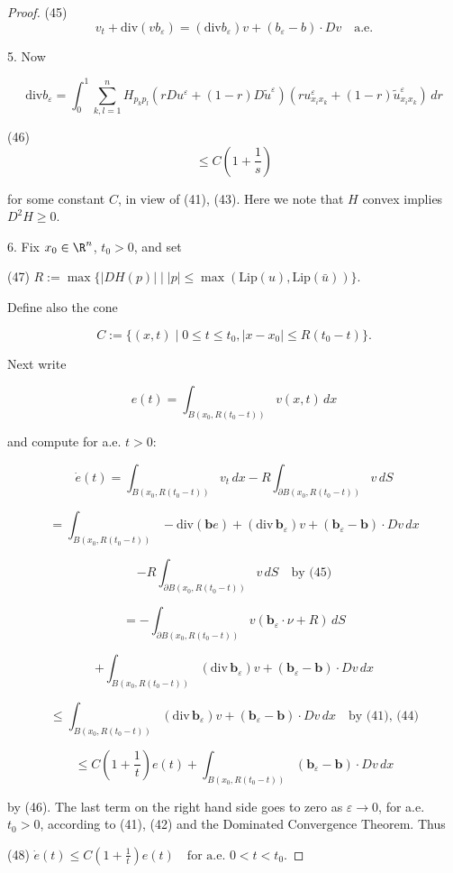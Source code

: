\begin{proof}
(45)
$$v_t + \text{div}(vb_\varepsilon) = (\text{div} b_\varepsilon)v + (b_\varepsilon - b) \cdot Dv \quad \text{a.e.}$$

5. Now

$$\text{div} b_\varepsilon = \int_0^1 \sum_{k,l=1}^n H_{p_k p_l}(rDu^\varepsilon + (1-r)D\tilde{u}^\varepsilon)(ru^\varepsilon_{x_i x_k} + (1-r)\tilde{u}^\varepsilon_{x_i x_k}) \, dr$$

(46)
$$\leq C \left(1 + \frac{1}{s}\right)$$

for some constant $C$, in view of (41), (43). Here we note that $H$ convex implies $D^2H \geq 0$.

6. Fix $x_0 \in \R^n$, $t_0 > 0$, and set

(47) \quad $R := \max\{|DH(p)| \mid |p| \leq \max(\text{Lip}(u), \text{Lip}(\bar{u}))\}$.

Define also the cone

$$C := \{(x,t) \mid 0 \leq t \leq t_0, |x - x_0| \leq R(t_0 - t)\}.$$

Next write

$$e(t) = \int_{B(x_0, R(t_0-t))} v(x,t)\,dx$$

and compute for a.e. $t > 0$:

$$\dot{e}(t) = \int_{B(x_0,R(t_0-t))} v_t\,dx - R \int_{\partial B(x_0, R(t_0-t))} v\,dS$$

$$= \int_{B(x_0,R(t_0-t))} -\text{div}(\mathbf{b}e) + (\text{div}\,\mathbf{b}_\varepsilon)v + (\mathbf{b}_\varepsilon - \mathbf{b}) \cdot Dv\,dx$$

$$- R \int_{\partial B(x_0, R(t_0-t))} v\,dS \quad \text{by (45)}$$

$$= - \int_{\partial B(x_0, R(t_0-t))} v(\mathbf{b}_\varepsilon \cdot \nu + R)\,dS$$

$$+ \int_{B(x_0, R(t_0-t))} (\text{div}\,\mathbf{b}_\varepsilon)v + (\mathbf{b}_\varepsilon - \mathbf{b}) \cdot Dv\,dx$$

$$\leq \int_{B(x_0, R(t_0-t))} (\text{div}\,\mathbf{b}_\varepsilon)v + (\mathbf{b}_\varepsilon - \mathbf{b}) \cdot Dv\,dx \quad \text{by (41), (44)}$$

$$\leq C\left(1 + \frac{1}{t}\right)e(t) + \int_{B(x_0, R(t_0-t))} (\mathbf{b}_\varepsilon - \mathbf{b}) \cdot Dv\,dx$$

by (46). The last term on the right hand side goes to zero as $\varepsilon \to 0$, for a.e. $t_0 > 0$, according to (41), (42) and the Dominated Convergence Theorem. Thus

(48) \quad $\dot{e}(t) \leq C\left(1 + \frac{1}{t}\right)e(t) \quad \text{for a.e.\ } 0 < t < t_0$.


\end{proof}
